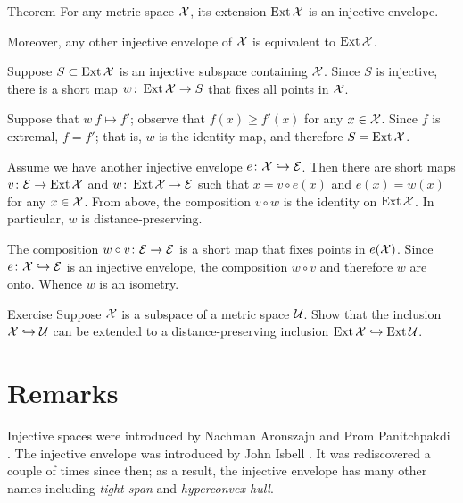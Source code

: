 \begin{thm}{Theorem}\label{thm:inj-envelope}
For any metric space $\mathcal{X}$, its extension $\mathop{\rm Ext}\nolimits\mathcal{X}$ is an injective envelope.

Moreover, any other injective envelope of $\mathcal{X}$ is equivalent to $\mathop{\rm Ext}\nolimits\mathcal{X}$.
\end{thm}

Suppose $S\subset \mathop{\rm Ext}\nolimits\mathcal{X}$ is an injective subspace containing $\mathcal{X}$.
Since $S$ is injective, there is a short map $w\colon\mathop{\rm Ext}\nolimits\mathcal{X}\to S$ that fixes all points in $\mathcal{X}$.

Suppose that $w\:f\mapsto f'$; observe that $f(x)\ge f'(x)$ for any $x\in \mathcal{X}$.
Since $f$ is extremal, $f=f'$;
that is, $w$ is the identity map, and therefore $S=\mathop{\rm Ext}\nolimits\mathcal{X}$.

Assume we have another injective envelope $e\colon\mathcal{X}\hookrightarrow \mathcal{E}$.
Then there are short maps $v\colon\mathcal{E}\to \mathop{\rm Ext}\nolimits\mathcal{X}$ and $w\colon\mathop{\rm Ext}\nolimits\mathcal{X}\to \mathcal{E}$ such that $x=v\circ e(x)$ and $e(x)=w(x)$ for any $x\in\mathcal{X}$.
From above, the composition $v\circ w$ is the identity on $\mathop{\rm Ext}\nolimits\mathcal{X}$.
In particular, $w$ is distance-preserving.

The composition $w\circ v\colon\mathcal{E}\to \mathcal{E}$ is a short map that fixes points in $e(\mathcal{X})$.
Since $e\colon\mathcal{X}\hookrightarrow \mathcal{E}$ is an injective envelope, the composition $w\circ v$ and therefore $w$ are onto.
Whence $w$ is an isometry.
\qeds

\begin{thm}{Exercise}\label{ex:d-p-inclusion}
Suppose $\mathcal{X}$ is a subspace of a metric space $\mathcal{U}$.
Show that the inclusion $\mathcal{X}\hookrightarrow\mathcal{U}$ can be extended to a distance-preserving inclusion $\mathop{\rm Ext}\nolimits\mathcal{X}\hookrightarrow\mathop{\rm Ext}\nolimits\mathcal{U}$.
\end{thm}


\section{Remarks}

Injective spaces were introduced by Nachman Aronszajn and Prom Panitchpakdi \cite{aronszajn-panitchpakdi}.
The injective envelope was introduced by John Isbell \cite{isbell}.
It was rediscovered a couple of times since then;
as a result, the injective envelope has many other names including \emph{tight span} and \emph{hyperconvex hull}.

